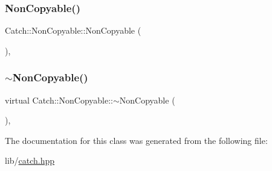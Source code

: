 \subsubsection{\texorpdfstring{Non\+Copyable()}{NonCopyable()}}
{\footnotesize\ttfamily Catch\+::\+Non\+Copyable\+::\+Non\+Copyable (\begin{DoxyParamCaption}{ }\end{DoxyParamCaption})\hspace{0.3cm}{\ttfamily [inline]}, {\ttfamily [protected]}}

\hypertarget{class_catch_1_1_non_copyable_a81254677280fef337eb4a676e91e3293}{}\label{class_catch_1_1_non_copyable_a81254677280fef337eb4a676e91e3293} 
\subsubsection{\texorpdfstring{$\sim$\+Non\+Copyable()}{~NonCopyable()}}
{\footnotesize\ttfamily virtual Catch\+::\+Non\+Copyable\+::$\sim$\+Non\+Copyable (\begin{DoxyParamCaption}{ }\end{DoxyParamCaption})\hspace{0.3cm}{\ttfamily [protected]}, {\ttfamily [virtual]}}



The documentation for this class was generated from the following file\+:\begin{DoxyCompactItemize}
\item 
lib/\hyperlink{catch_8hpp}{catch.\+hpp}\end{DoxyCompactItemize}
